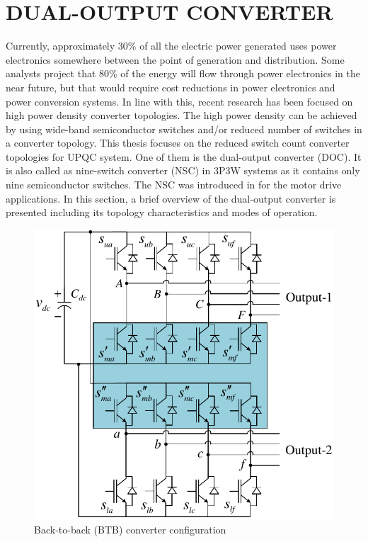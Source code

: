 %	
%

\section{DUAL-OUTPUT CONVERTER} \label{2.Section_DOC}

Currently, approximately 30\% of all the electric power generated uses power electronics somewhere between the point of generation and distribution. Some analysts project that 80\% of the energy will flow through power electronics in the near future, but that would require cost reductions in power electronics and power conversion systems. In line with this, recent research has been focused on high power density converter topologies. The high power density can be achieved by using wide-band semiconductor switches and/or reduced number of switches in a converter topology. This thesis focuses on the reduced switch count converter topologies for UPQC system. One of them is the dual-output converter (DOC). It is also called as nine-switch converter (NSC) in 3P3W systems as it contains only nine semiconductor switches. The NSC was introduced in \cite{4348103} for the motor drive applications. In this section, a brief overview of the dual-output converter is presented including its
topology characteristics and modes of operation.
\begin{figure}[ht]
	\centering
	\includegraphics[scale=0.88]{figures/Chapter_1_2/BTB}
	\caption{Back-to-back (BTB) converter configuration}
	\label{2.BTB}
\end{figure}

